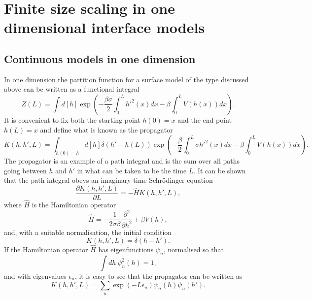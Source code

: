     \section{Finite size scaling in one dimensional interface models}
    \label{sec-continuous-model}

\subsection{Continuous models in one dimension}

In one dimension the partition function for a surface model of the type discussed above can be written as a functional integral  
\begin{equation}
    Z(L)  = \int d[h]\exp\left(-\frac{\beta\sigma}{2}\int_0^L h'^2(x) dx -\beta\int_0^L  V(h(x)) dx\right).
\end{equation}
It is convenient to fix both the starting point $h(0)=x$ and the end point $h(L)=x$ and define what is known as the propagator
\begin{equation}
    K(h,h',L)=\int_{h(0)=h} d[h] \delta(h' -h(L)) \exp\left(-\frac{\beta}{2}\int_0^L \sigma h'^2(x) dx -\beta \int_0^L  V(h(x)) dx\right).
    \label{prog}
\end{equation}
The propagator is an example of a path integral and is the sum over all paths going between 
$h$ and $h'$ in what can be taken to be the time $L$.  It can be shown that the path integral obeys an imaginary time Schr\"odinger equation
\begin{equation}
    \frac{\partial  K(h,h',L)}{\partial L} = -\hat H K(h,h',L),
\end{equation}
where $\hat H$ is the Hamiltonian operator
\begin{equation}
    \hat H = -\frac{1}{2\sigma\beta}\frac{\partial^2 }{\partial h^2} + \beta V(h),
\end{equation}
and, with a suitable normalisation, the initial condition
\begin{equation}
    K(h,h',L)=\delta(h-h').
\end{equation}
If the Hamiltonian operator $\hat H$ has eigenfunctions $\psi_n$, normalised so that
\begin{equation}
    \int dh \ \psi^2_n(h) = 1,
\end{equation}
 and with eigenvalues $\epsilon_n$, it is easy to see that the propagator can be written as
\begin{equation}
    K(h,h',L)= \sum_n \exp(-L\epsilon_n)\psi_n(h)\psi_n(h').
\end{equation}
